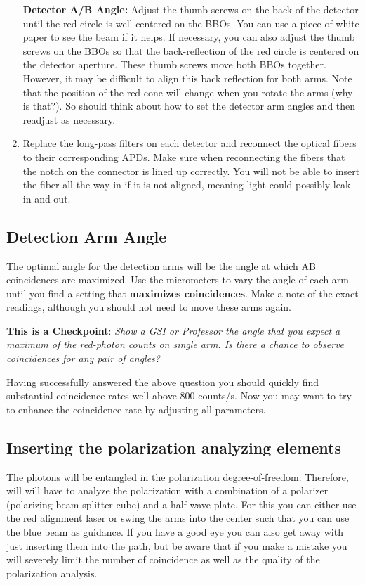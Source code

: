 \documentclass{../lab}
\begin{document}
\begin{enumerate}
    \textbf{Detector A/B Angle:} Adjust the thumb screws on the back of the detector until the red circle is well centered on the BBOs. You can use a piece of white paper to see the beam if it helps. If necessary, you can also adjust the thumb screws on the BBOs so that the back-reflection of the red circle is centered on the detector aperture. These thumb screws move both BBOs together. However, it may be difficult to align this back reflection for both arms. Note that the position of the red-cone will change when you rotate the arms (why is that?). So should think about how to set the detector arm angles and then readjust as necessary.

    \item Replace the long-pass filters on each detector and reconnect the optical fibers to their corresponding APDs. Make sure when reconnecting the fibers that the notch on the connector is lined up correctly. You will not be able to insert the fiber all the way in if it is not aligned, meaning light could possibly leak in and out.

\end{enumerate}

\subsection{Detection Arm Angle}

The optimal angle for the detection arms will be the angle at which AB coincidences are maximized. Use the micrometers to vary the angle of each arm until you find a setting that \textbf{maximizes coincidences}. Make a note of the exact readings, although you should not need to move these arms again.

\textbf{This is a Checkpoint}: \emph{Show a GSI or Professor the angle that you expect a maximum of the red-photon counts on single arm. Is there a chance to observe coincidences for any pair of angles?}

Having successfully answered the above question you should quickly find substantial coincidence rates well above 800 counts/s. Now you may want to try to enhance the coincidence rate by adjusting all parameters.

\subsection{Inserting the polarization analyzing elements}

The photons will be entangled in the polarization degree-of-freedom. Therefore, will will have to analyze the polarization with a combination of a polarizer (polarizing beam splitter cube) and a half-wave plate. For this you can either use the red alignment laser or swing the arms into the center such that you can use the blue beam as guidance. If you have a good eye you can also get away with just inserting them into the path, but be aware that if you make a mistake you will severely limit the number of coincidence as well as the quality of the polarization analysis.
\end{document}
